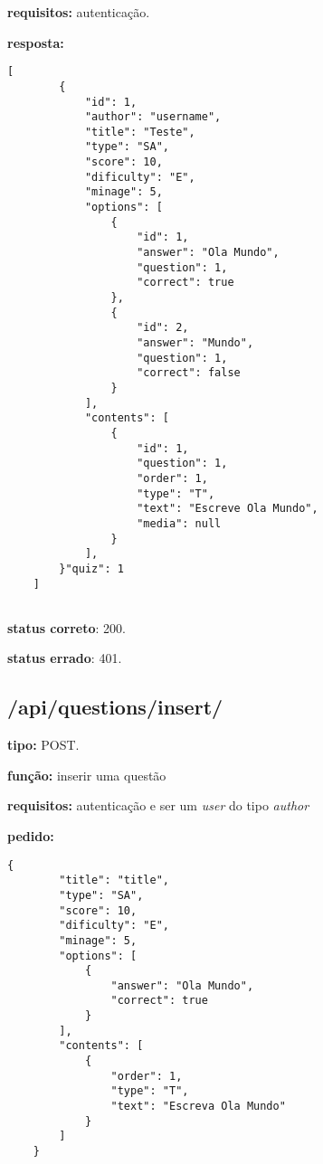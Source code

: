 \documentclass[11pt,a4paper]{report}
\begin{document}
\textbf{requisitos:} autenticação.

\textbf{resposta:}

\begin{lstlisting}[style = code]
   [
        {
            "id": 1,
            "author": "username",
            "title": "Teste",
            "type": "SA",
            "score": 10,
            "dificulty": "E",
            "minage": 5,
            "options": [
                {
                    "id": 1,
                    "answer": "Ola Mundo",
                    "question": 1,
                    "correct": true
                },
                {
                    "id": 2,
                    "answer": "Mundo",
                    "question": 1,
                    "correct": false
                }
            ],
            "contents": [
                {
                    "id": 1,
                    "question": 1,
                    "order": 1,
                    "type": "T",
                    "text": "Escreve Ola Mundo",
                    "media": null
                }
            ],
        }"quiz": 1
    ]
    
\end{lstlisting}

\textbf{status correto}: 200.

\textbf{status errado}: 401.

\newpage

\subsection{/api/questions/insert/}

\textbf{tipo:} POST.

\textbf{função:} inserir uma questão

\textbf{requisitos:} autenticação e ser um \emph{user} do tipo \emph{author}

\textbf{pedido:}

\begin{lstlisting}[style = code]
   {
        "title": "title",
        "type": "SA",
        "score": 10,
        "dificulty": "E",
        "minage": 5,
        "options": [
            {
                "answer": "Ola Mundo",
                "correct": true
            }
        ],
        "contents": [
            {
                "order": 1,
                "type": "T",
                "text": "Escreva Ola Mundo"
            }
        ]
    }
\end{lstlisting}
\end{document}
